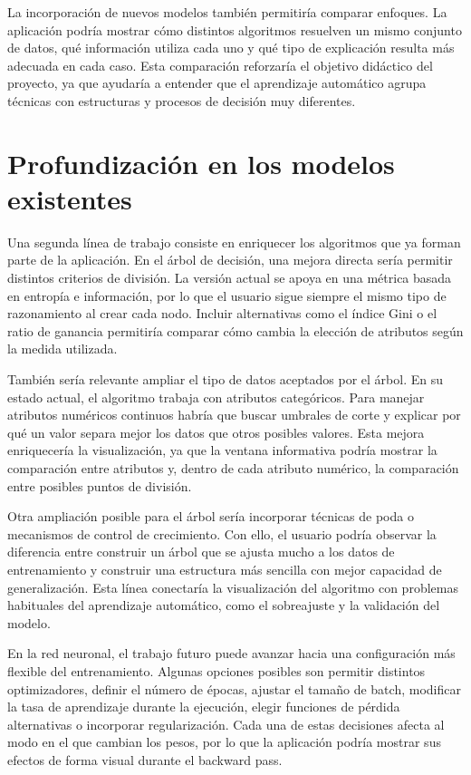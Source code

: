 La incorporación de nuevos modelos también permitiría comparar enfoques. La aplicación podría mostrar cómo distintos algoritmos resuelven un mismo conjunto de datos, qué información utiliza cada uno y qué tipo de explicación resulta más adecuada en cada caso. Esta comparación reforzaría el objetivo didáctico del proyecto, ya que ayudaría a entender que el aprendizaje automático agrupa técnicas con estructuras y procesos de decisión muy diferentes.

\section{Profundización en los modelos existentes}

Una segunda línea de trabajo consiste en enriquecer los algoritmos que ya forman parte de la aplicación. En el árbol de decisión, una mejora directa sería permitir distintos criterios de división. La versión actual se apoya en una métrica basada en entropía e información, por lo que el usuario sigue siempre el mismo tipo de razonamiento al crear cada nodo. Incluir alternativas como el índice Gini o el ratio de ganancia permitiría comparar cómo cambia la elección de atributos según la medida utilizada.

También sería relevante ampliar el tipo de datos aceptados por el árbol. En su estado actual, el algoritmo trabaja con atributos categóricos. Para manejar atributos numéricos continuos habría que buscar umbrales de corte y explicar por qué un valor separa mejor los datos que otros posibles valores. Esta mejora enriquecería la visualización, ya que la ventana informativa podría mostrar la comparación entre atributos y, dentro de cada atributo numérico, la comparación entre posibles puntos de división.

Otra ampliación posible para el árbol sería incorporar técnicas de poda o mecanismos de control de crecimiento. Con ello, el usuario podría observar la diferencia entre construir un árbol que se ajusta mucho a los datos de entrenamiento y construir una estructura más sencilla con mejor capacidad de generalización. Esta línea conectaría la visualización del algoritmo con problemas habituales del aprendizaje automático, como el sobreajuste y la validación del modelo.

En la red neuronal, el trabajo futuro puede avanzar hacia una configuración más flexible del entrenamiento. Algunas opciones posibles son permitir distintos optimizadores, definir el número de épocas, ajustar el tamaño de batch, modificar la tasa de aprendizaje durante la ejecución, elegir funciones de pérdida alternativas o incorporar regularización. Cada una de estas decisiones afecta al modo en el que cambian los pesos, por lo que la aplicación podría mostrar sus efectos de forma visual durante el backward pass.

